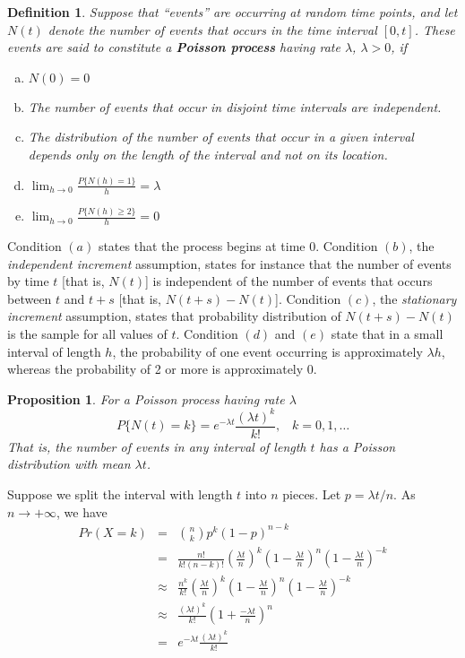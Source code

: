\documentclass[12pt]{article}
\newtheorem{definition}[theorem]{Definition}
\newtheorem{proposition}[theorem]{Proposition}
\begin{document}
\begin{definition}
  Suppose that ``events'' are occurring at random time points, and let $N(t)$ denote the number of events that occurs in the time interval $[0,t]$. These events are said to constitute a \textbf{Poisson process} having rate $\lambda$, $\lambda > 0$, if
  \begin{enumerate} [(a)]
    \item $N(0) = 0$
    \item The number of events that occur in disjoint time intervals are independent.
    \item The distribution of the number of events that occur in a given interval depends only on the length of the interval and not on its location.
    \item $\lim_{h \rightarrow 0} \frac {P\{ N(h) = 1 \} }{h} = \lambda$
    \item $\lim_{h \rightarrow 0} \frac {P\{ N(h) \ge 2 \} }{h} = 0$
  \end{enumerate}
\end{definition}

Condition $(a)$ states that the process begins at time 0. Condition $(b)$, the \emph{independent increment} assumption, states for instance that the number of events by time $t$ [that is, $N(t)$] is independent of the number of events that occurs between $t$ and $t+s$ [that is, $N(t+s) - N(t)$]. Condition $(c)$,  the \emph{stationary increment} assumption, states that probability distribution of $N(t+s) - N(t)$ is the sample for all values of $t$. Condition $(d)$ and $(e)$ state that in a small interval of length $h$, the probability of one event occurring is approximately $\lambda h$, whereas the probability of 2 or more is approximately 0. \\

\begin{proposition}
  For a Poisson process having rate $\lambda$
  \begin{equation*}
    P\{ N(t)=k \} = e^{-\lambda t} \frac{(\lambda t)^k}{k!}, \;\;\; k=0,1,\dots
  \end{equation*}
  That is, the number of events in any interval of length $t$ has a Poisson distribution with mean $\lambda t$.
\end{proposition}

Suppose we split the interval with length $t$ into $n$ pieces. Let $p = \lambda t/n$. As $n \rightarrow +\infty$, we have
\begin{eqnarray*}
  Pr(X = k)
  &=& \binom {n}{k} p^k (1-p)^{n-k} \\
  &=& \frac{n!}{k! (n-k)!} \left( \frac{\lambda t}{n} \right)^k
  \left( 1 - \frac{\lambda t}{n} \right)^n
  \left( 1 - \frac{\lambda t}{n} \right)^{-k} \\
  &\approx& \frac {n^k}{k!} \left( \frac{\lambda t}{n} \right)^k
  \left( 1 - \frac{\lambda t}{n} \right)^n
  \left( 1 - \frac{\lambda t}{n} \right)^{-k} \\
  &\approx& \frac{(\lambda  t)^k}{k!} \left( 1 + \frac{- \lambda t}{n}
  \right)^n \\
  &=& e^{-\lambda t} \frac{(\lambda t)^k}{k!} 
\end{eqnarray*}
\end{document}
